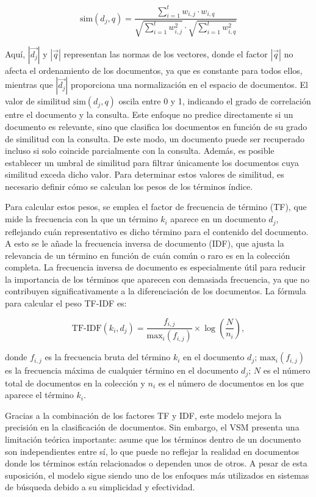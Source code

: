 \[
\text{sim}(d_j, q) = \frac{\sum_{i=1}^t w_{i,j} \cdot w_{i,q}}{\sqrt{\sum_{i=1}^t w_{i,j}^2} \cdot \sqrt{\sum_{i=1}^t w_{i,q}^2}}
\]

Aquí, \( |\vec{d_j}| \) y \( |\vec{q}| \) representan las normas de los vectores, 
donde el factor \( |\vec{q}| \) no afecta el ordenamiento de los documentos, 
ya que es constante para todos ellos, mientras que \( |\vec{d_j}| \) proporciona 
una normalización en el espacio de documentos. El valor de similitud \( \text{sim}(d_j, q) \) 
oscila entre 0 y 1, indicando el grado de correlación entre el documento y la consulta. 
Este enfoque no predice directamente si un documento es relevante, sino que clasifica 
los documentos en función de su grado de similitud con la consulta. De este modo, 
un documento puede ser recuperado incluso si solo coincide parcialmente con la consulta. 
Además, es posible establecer un umbral de similitud para filtrar únicamente los documentos 
cuya similitud exceda dicho valor. Para determinar estos valores de similitud, 
es necesario definir cómo se calculan los pesos de los términos índice.

Para calcular estos pesos, se emplea el factor de frecuencia de término (TF), 
que mide la frecuencia con la que un término \( k_i \) aparece en un documento \( d_j \), 
reflejando cuán representativo es dicho término para el contenido del documento. 
A esto se le añade la frecuencia inversa de documento (IDF), que ajusta la relevancia 
de un término en función de cuán común o raro es en la colección completa. 
La frecuencia inversa de documento es especialmente útil para reducir la importancia 
de los términos que aparecen con demasiada frecuencia, ya que no contribuyen 
significativamente a la diferenciación de los documentos. La fórmula para 
calcular el peso TF-IDF es:

\[
\text{TF-IDF}(k_i, d_j) = \frac{f_{i,j}}{\text{max}_i(f_{i,j})} \times \log \left( \frac{N}{n_i} \right),
\]

donde \( f_{i,j} \) es la frecuencia bruta del término \( k_i \) en el documento \( d_j \); 
\( \text{max}_i(f_{i,j}) \) es la frecuencia máxima de cualquier término en el documento 
\( d_j \); \( N \) es el número total de documentos en la colección y \( n_i \) 
es el número de documentos en los que aparece el término \( k_i \).

Gracias a la combinación de los factores TF y IDF, este modelo mejora la precisión 
en la clasificación de documentos. Sin embargo, el VSM presenta una limitación teórica 
importante: asume que los términos dentro de un documento son independientes entre sí, 
lo que puede no reflejar la realidad en documentos donde los términos están relacionados 
o dependen unos de otros. A pesar de esta suposición, el modelo sigue siendo uno de 
los enfoques más utilizados en sistemas de búsqueda debido a su simplicidad y efectividad.

